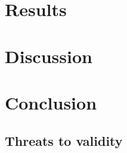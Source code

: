 \documentclass[sigplan,10pt,review,anonymous]{acmart}
\begin{document}
\section{Results}

\section{Discussion}

\section{Conclusion}

\subsection{Threats to validity}



%


%

\end{document}
